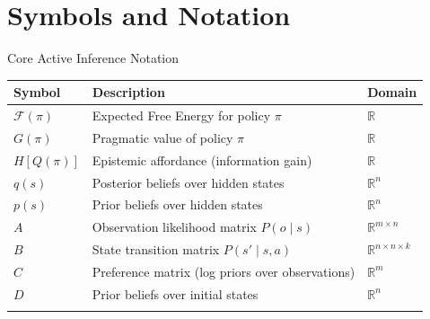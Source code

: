 \documentclass[
  ignorenonframetext,
]{beamer}
\author{\texorpdfstring{}{}}
\date{}
\newcounter{none} %
\begin{document}
\section{Symbols and Notation}\label{sec:symbols_glossary}

\begin{frame}{Core Active Inference Notation}
\protect{}\label{core-active-inference-notation}
{\def\LTcaptype{none} %
\begin{longtable}[]{@{}
  >{\raggedright\arraybackslash}p{}
  >{\raggedright\arraybackslash}p{}
  >{\raggedright\arraybackslash}p{}@{}}
\toprule\noalign{}
\begin{minipage}[b]{\linewidth}\raggedright
Symbol
\end{minipage} & \begin{minipage}[b]{\linewidth}\raggedright
Description
\end{minipage} & \begin{minipage}[b]{\linewidth}\raggedright
Domain
\end{minipage} \\
\midrule\noalign{}
\endhead
\(\mathcal{F}(\pi)\) & Expected Free Energy for policy \(\pi\) &
\(\mathbb{R}\) \\
\(G(\pi)\) & Pragmatic value of policy \(\pi\) & \(\mathbb{R}\) \\
\(H[Q(\pi)]\) & Epistemic affordance (information gain) &
\(\mathbb{R}\) \\
\(q(s)\) & Posterior beliefs over hidden states & \(\mathbb{R}^n\) \\
\(p(s)\) & Prior beliefs over hidden states & \(\mathbb{R}^n\) \\
\(A\) & Observation likelihood matrix \(P(o \mid s)\) &
\(\mathbb{R}^{m \times n}\) \\
\(B\) & State transition matrix \(P(s' \mid s, a)\) &
\(\mathbb{R}^{n \times n \times k}\) \\
\(C\) & Preference matrix (log priors over observations) &
\(\mathbb{R}^m\) \\
\(D\) & Prior beliefs over initial states & \(\mathbb{R}^n\) \\
\bottomrule\noalign{}
\end{longtable}
}
\end{frame}
\end{document}
